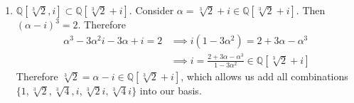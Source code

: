 \begin{solution}
\begin{enumerate}
      \item $\mathbb{Q}[\sqrt[3]{2}, i] \subset \mathbb{Q}[\sqrt[3]{2} + i]$. Consider $\alpha = \sqrt[3]{2} + i \in \mathbb{Q}[\sqrt[3]{2} + i]$. Then $(\alpha - i)^3 = 2$. Therefore 
      \begin{align}
        \alpha^3 - 3 \alpha^2 i - 3 \alpha + i = 2 & \implies i(1 - 3 \alpha^2) = 2 + 3 \alpha - \alpha^3 \\ 
                                                   & \implies i = \frac{2 + 3 \alpha - \alpha^3}{1 - 3 \alpha^2} \in \mathbb{Q}[\sqrt[3]{2} + i]
      \end{align}
      Therefore $\sqrt[3]{2} = \alpha - i \in \mathbb{Q}[\sqrt[3]{2} + i]$, which allows us add all combinations $\{1, \sqrt[3]{2}, \sqrt[3]{4}, i, \sqrt[3]{2} i, \sqrt[3]{4} i\}$ into our basis. 
    \end{enumerate}
  \end{solution}

